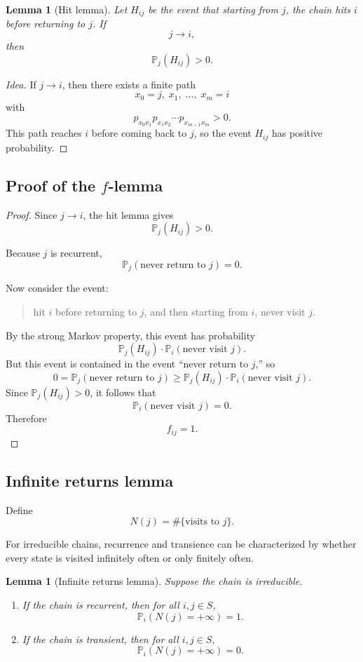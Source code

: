 \documentclass[11pt]{article}
\newtheorem{lemma}[theorem]{Lemma}
\theoremstyle{definition}
\begin{document}
\begin{lemma}[Hit lemma]
Let \(H_{ij}\) be the event that starting from \(j\), the chain hits \(i\) before returning to \(j\). If
\[
j\to i,
\]
then
\[
\mathbb P_j(H_{ij})>0.
\]
\end{lemma}

\begin{proof}[Idea]
If \(j\to i\), then there exists a finite path
\[
x_0=j,\;x_1,\;\dots,\;x_m=i
\]
with
\[
p_{x_0x_1}p_{x_1x_2}\cdots p_{x_{m-1}x_m}>0.
\]
This path reaches \(i\) before coming back to \(j\), so the event \(H_{ij}\) has positive probability.
\end{proof}

\subsection{Proof of the \texorpdfstring{$f$}{f}-lemma}

\begin{proof}
Since \(j\to i\), the hit lemma gives
\[
\mathbb P_j(H_{ij})>0.
\]

Because \(j\) is recurrent,
\[
\mathbb P_j(\text{never return to } j)=0.
\]

Now consider the event:
\begin{quote}
hit \(i\) before returning to \(j\), and then starting from \(i\), never visit \(j\).
\end{quote}
By the strong Markov property, this event has probability
\[
\mathbb P_j(H_{ij})\cdot \mathbb P_i(\text{never visit } j).
\]
But this event is contained in the event ``never return to \(j\),''
so
\[
0
=
\mathbb P_j(\text{never return to } j)
\ge
\mathbb P_j(H_{ij})\cdot \mathbb P_i(\text{never visit } j).
\]
Since \(\mathbb P_j(H_{ij})>0\), it follows that
\[
\mathbb P_i(\text{never visit } j)=0.
\]
Therefore
\[
f_{ij}=1.
\]
\end{proof}

\subsection{Infinite returns lemma}

Define
\[
N(j)=\#\{\text{visits to } j\}.
\]

For irreducible chains, recurrence and transience can be characterized by whether every state is visited infinitely often or only finitely often.

\begin{lemma}[Infinite returns lemma]
Suppose the chain is irreducible.
\begin{enumerate}[label=(\roman*)]
    \item If the chain is recurrent, then for all \(i,j\in S\),
    \[
    \mathbb P_i(N(j)=+\infty)=1.
    \]
    \item If the chain is transient, then for all \(i,j\in S\),
    \[
    \mathbb P_i(N(j)=+\infty)=0.
    \]
\end{enumerate}
\end{lemma}
\end{document}
